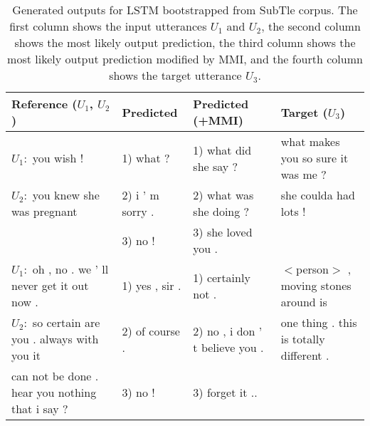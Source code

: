 \documentclass[11pt]{article}
\begin{document}
\begin{table}[!ht]
{\scriptsize
  \begin{center}
    \begin{tabular}{| l | l | l | l |}
    \hline
   Reference ($U_1$, $U_2$) & Predicted & Predicted (+MMI) & Target ($U_3$)  \\ \hline
     $U_1:$ you wish !               & 1) what ?	    & 1)      what did she say ?       &  what makes you so sure it was me ?\\ 
     $U_2:$ you knew she was pregnant & 2) i ' m sorry . & 2) what was she doing ?	  &  she coulda had lots !  \\
     & 3) no ! & 3) she loved you .  &  \\\hline
     
      $U_1:$ oh , no . we ' ll never get it out now . & 1) yes , sir .	 & 1) certainly not .	  & $<$person$>$ , moving stones around is   \\ 
     $U_2:$ so certain are you . always with you it  & 2) of course . & 2) no , i don ' t believe you .	
	  &  one thing .  this is totally different .\\
     can not be done . hear you nothing that i say ?  & 3) no ! & 3) forget it ..  &  \\\hline


  \end{tabular}
  \caption{\label{tab:output} Generated outputs for LSTM bootstrapped from SubTle corpus. The first column shows the input utterances $U_1$ and $U_2$, the second column shows the most likely output prediction, the third column shows the most likely output prediction modified by MMI, and the fourth column shows the target utterance $U_3$.}
  \end{center}
  }
\end{table}
\end{document}

